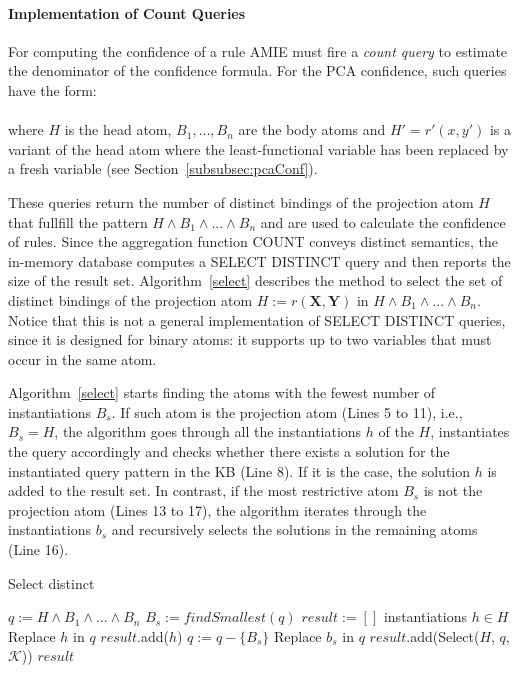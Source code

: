 \paragraph{Implementation of Count Queries} 
For computing the confidence of a rule AMIE must fire a \emph{count query} to estimate the denominator
of the confidence formula. For the PCA confidence, such queries have the form: \\

 \\

\noindent where $H$ is the head atom, $B_1, \dots, B_n$ are the body atoms and $H'= r'(x,y')$ is a variant of the
head atom where the least-functional variable has been replaced by a fresh variable (see Section~\ref{subsubsec:pcaConf}).

These queries return the number of distinct bindings of the projection atom $H$ 
that fullfill the pattern $H \wedge B_1 \wedge ... \wedge B_n$ and are used to
calculate the confidence of rules. Since the aggregation function COUNT conveys
distinct semantics, the in-memory database computes a SELECT DISTINCT query 
and then reports the size of the result set. Algorithm~\ref{select} describes
the method to select the set of distinct bindings of the projection atom $H := r(\bm{X}, \bm{Y})$ in
$H \wedge B_1 \wedge ... \wedge B_n$. Notice that this is not a general implementation of SELECT DISTINCT queries,
since it is designed for binary atoms: it supports up to two variables that must occur in the same atom.

Algorithm~\ref{select} starts finding the atoms with the fewest number of instantiations $B_s$. If such atom is the
projection atom (Lines 5 to 11), i.e., $B_s = H$, the algorithm goes through all the instantiations $h$ of the $H$, instantiates
the query accordingly and checks whether there exists a solution for the instantiated query pattern in the KB (Line 8). 
If it is the case, the solution $h$ is added to the result set. In contrast, if the most restrictive atom $B_s$ is not 
the projection atom (Lines 13 to 17), the algorithm iterates through the instantiations $b_s$ and recursively 
selects the solutions in the remaining atoms (Line 16).

\begin{algorithm}
\caption{Select distinct}
\label{select}
\begin{algorithmic}[1]
    \State $q := H \wedge B_1 \wedge ... \wedge B_n$
    \State $B_s := findSmallest(q)$
    \State $result := [ ]$
      \ForAll instantiations $h \in H$
	\State Replace $h$ in $q$
	  \State $result$.add($h$)
	\EndIf
      \EndFor
    \Else
      \State $q := q - \{ B_s\}$
      	\State Replace $b_s$ in $q$
      	\State $result$.add(Select($H$, $q$, $\mathcal{K}$))
      \EndFor
    \EndIf
    \State \Return $result$
\EndFunction
\end{algorithmic}
\end{algorithm}




